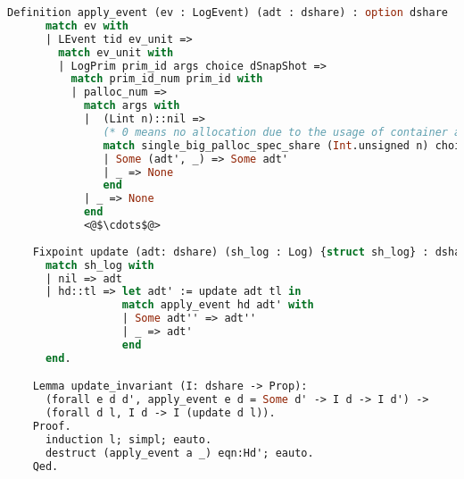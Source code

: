 \begin{lstlisting}[language=Caml]
    Definition apply_event (ev : LogEvent) (adt : dshare) : option dshare := 
      match ev with 
      | LEvent tid ev_unit =>
        match ev_unit with 
        | LogPrim prim_id args choice dSnapShot =>
          match prim_id_num prim_id with 
          | palloc_num =>
            match args with 
            |  (Lint n)::nil =>
               (* 0 means no allocation due to the usage of container and 1 means allocation trial happens *)
               match single_big_palloc_spec_share (Int.unsigned n) choice adt with 
               | Some (adt', _) => Some adt'
               | _ => None 
               end
            | _ => None
            end
            <@$\cdots$@>
            
    Fixpoint update (adt: dshare) (sh_log : Log) {struct sh_log} : dshare :=
      match sh_log with
      | nil => adt
      | hd::tl => let adt' := update adt tl in 
                  match apply_event hd adt' with 
                  | Some adt'' => adt'' 
                  | _ => adt' 
                  end
      end.

    Lemma update_invariant (I: dshare -> Prop):
      (forall e d d', apply_event e d = Some d' -> I d -> I d') ->
      (forall d l, I d -> I (update d l)).
    Proof.
      induction l; simpl; eauto.
      destruct (apply_event a _) eqn:Hd'; eauto.
    Qed.
\end{lstlisting}

